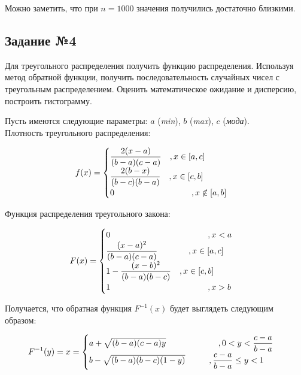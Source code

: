 \documentclass[14pt,fleqn]{extarticle}
\begin{document}
	Можно заметить, что при $n = 1000$ значения получились достаточно близкими.
	\newpage
	\subsection*{Задание №4}
	Для треугольного распределения получить функцию распределения. Используя метод обратной функции, получить последовательность случайных чисел с треугольным распределением. Оценить математическое ожидание и дисперсию, построить гистограмму.\\
	\newline
	
	Пусть имеются следующие параметры: $a$ (\textit{min}), $b$ (\textit{max}), $c$ (\textit{мода}).\\
    Плотность треугольного распределения:
    \begin{ceqn}
	\begin{align*}
		f(x) =
		\begin{cases}
			\dfrac{2(x-a)}{(b-a)(c-a)} \quad , x \in [a,c]\\
			\dfrac{2(b-x)}{(b-c)(b-a)} \quad , x \in [c,b]\\
			0 \hspace{3.25cm} , x \centernot\in [a,b]\\
		\end{cases}
	\end{align*}
    \end{ceqn}

    Функция распределения треугольного закона:
    \begin{ceqn}
	\begin{align*}
		F(x) =
		\begin{cases}
			0 \hspace{4.1cm} , x < a\\
			\dfrac{(x-a)^2}{(b-a)(c-a)} \hspace{1.3cm} , x \in [a,c]\\
			1 - \dfrac{(x-b)^2}{(b-a)(b-c)} \quad , x \in [c,b]\\
			1 \hspace{4.1cm} , x > b\\
		\end{cases}
	\end{align*}
    \end{ceqn}

	Получается, что обратная функция $F^{-1}(x)$ будет выглядеть следующим образом:
	\begin{ceqn}
	\begin{align*}
		F^{-1}(y) = x =
		\begin{cases}
			a + \sqrt{(b-a)(c-a)y} \hspace{2.2cm} , 0 < y < \dfrac{c-a}{b-a}\\
			b - \sqrt{(b-a)(b-c)(1-y)} \hspace{1cm} , \dfrac{c-a}{b-a} \leq y < 1\\
		\end{cases}
	\end{align*}
    \end{ceqn}
\end{document}
